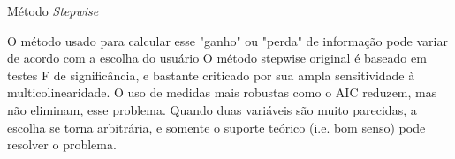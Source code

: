 \documentclass{beamer}\usepackage[]{graphicx}\usepackage[]{color}
\begin{document}
\begin{frame}{Método \emph{Stepwise}}

O método usado para calcular esse "ganho" ou "perda" de informação pode variar de acordo com a escolha do usuário \pause
\vfill
O método stepwise original é baseado em testes F de significância, e bastante criticado por sua ampla sensitividade à multicolinearidade. \pause
\vfill
O uso de medidas mais robustas como o AIC reduzem, mas não eliminam, esse problema. \pause
\vfill
Quando duas variáveis são muito parecidas, a escolha se torna arbitrária, e somente o suporte teórico (i.e. bom senso) pode resolver o problema.

\end{frame}
\end{document}

